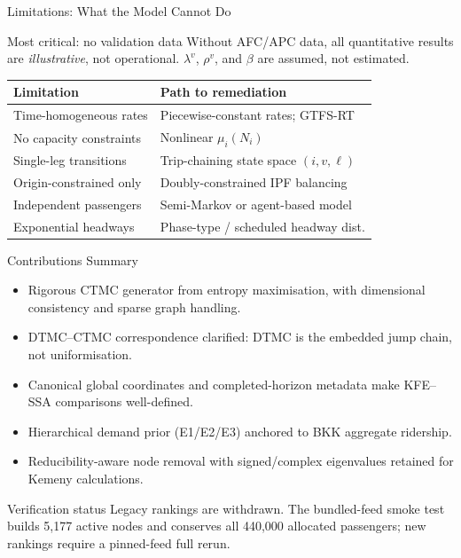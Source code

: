 \documentclass[aspectratio=169,12pt]{beamer}
\begin{document}
\begin{frame}{Limitations: What the Model Cannot Do}
\begin{alertblock}{Most critical: no validation data}
Without AFC/APC data, all quantitative results are \emph{illustrative}, not operational.
$\lambda^v$, $\rho^v$, and $\beta$ are assumed, not estimated.
\end{alertblock}

\vspace{6pt}
\begin{center}
\begin{tabular}{ll}
\toprule
Limitation & Path to remediation \\
\midrule
Time-homogeneous rates     & Piecewise-constant rates; GTFS-RT \\
No capacity constraints    & Nonlinear $\mu_i(N_i)$ \\
Single-leg transitions     & Trip-chaining state space $(i,v,\ell)$ \\
Origin-constrained only    & Doubly-constrained IPF balancing \\
Independent passengers     & Semi-Markov or agent-based model \\
Exponential headways       & Phase-type / scheduled headway dist. \\
\bottomrule
\end{tabular}
\end{center}
\end{frame}

\begin{frame}{Contributions Summary}
\begin{itemize}
  \item[\textbf{C1.}] Rigorous CTMC generator from entropy maximisation,
    with dimensional consistency and sparse graph handling.
  \item[\textbf{C2.}] DTMC--CTMC correspondence clarified: DTMC is the embedded
    jump chain, not uniformisation.
  \item[\textbf{C3.}] Canonical global coordinates and completed-horizon
    metadata make KFE--SSA comparisons well-defined.
  \item[\textbf{C4.}] Hierarchical demand prior (E1/E2/E3) anchored to BKK
    aggregate ridership.
  \item[\textbf{C5.}] Reducibility-aware node removal with signed/complex
    eigenvalues retained for Kemeny calculations.
\end{itemize}

\begin{block}{Verification status}
Legacy rankings are withdrawn. The bundled-feed smoke test builds 5,177 active
nodes and conserves all 440,000 allocated passengers; new rankings require a
pinned-feed full rerun.
\end{block}
\end{frame}
\end{document}
